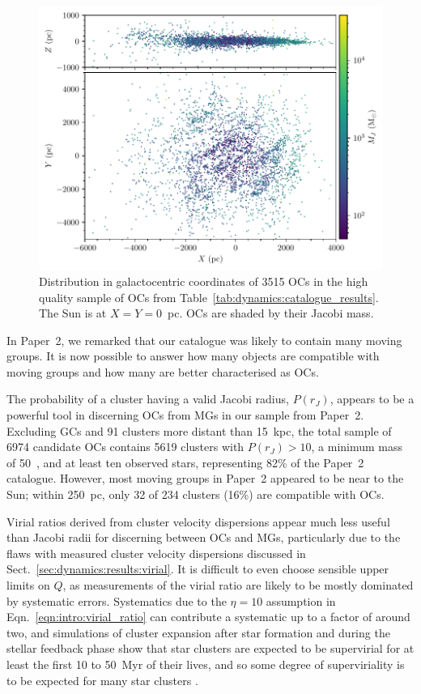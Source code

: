 \begin{figure}[t]
    \centering
    \includegraphics[width=\textwidth]{fig/c4/discussion_xyz_distribution.pdf}
    \caption[Distribution in galactocentric coordinates of 3515 OCs in the high quality sample of OCs]{Distribution in galactocentric coordinates of 3515 OCs in the high quality sample of OCs from Table~\ref{tab:dynamics:catalogue_results}. The Sun is at $X=Y=0$~pc. OCs are shaded by their Jacobi mass.}
    \label{fig:dynamics:discussion:xyz_distribution}
\end{figure}


In Paper~2, we remarked that our catalogue was likely to contain many moving groups. It is now possible to answer how many objects are compatible with moving groups and how many are better characterised as OCs.

The probability of a cluster having a valid Jacobi radius, $P(r_J)$, appears to be a powerful tool in discerning OCs from MGs in our sample from Paper~2. Excluding GCs and 91 clusters more distant than 15~kpc, the total sample of 6974 candidate OCs contains 5619 clusters with $P(r_J)>10$, a minimum mass of 50~\MSun, and at least ten observed stars, representing 82\% of the Paper~2 catalogue. However, most moving groups in Paper~2 appeared to be near to the Sun; within 250~pc, only 32 of 234 clusters (16\%) are compatible with OCs.

Virial ratios derived from cluster velocity dispersions appear much less useful than Jacobi radii for discerning between OCs and MGs, particularly due to the flaws with measured cluster velocity dispersions discussed in Sect.~\ref{sec:dynamics:results:virial}. It is difficult to even choose sensible upper limits on $Q$, as measurements of the virial ratio are likely to be mostly dominated by systematic errors. Systematics due to the $\eta=10$ assumption in Eqn.~\ref{eqn:intro:virial_ratio} can contribute a systematic up to a factor of around two, and simulations of cluster expansion after star formation and during the stellar feedback phase show that star clusters are expected to be supervirial for at least the first 10 to 50~Myr of their lives, and so some degree of superviriality is to be expected for many star clusters \citep{banerjee_how_2017}. 

